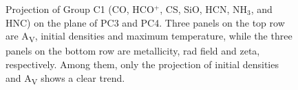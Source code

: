 \documentclass{aa}
\begin{document}
\begin{CJK*}{UTF8}{gbsn}
\begin{figure}[htbp]
{}
\caption{Projection of Group C1 (CO, HCO$^+$, CS, SiO, HCN, NH$_3$, and HNC) on the plane of PC3 and PC4. Three panels on the top row are A\textsubscript{V}, initial densities and maximum temperature, while the three panels on the bottom row are metallicity, rad field and zeta, respectively. Among them, only the projection of initial densities and A\textsubscript{V} shows a clear trend.}
\label{C1-34}
\end{figure}

  
  

   
   
   


\end{CJK*}
\end{document}
